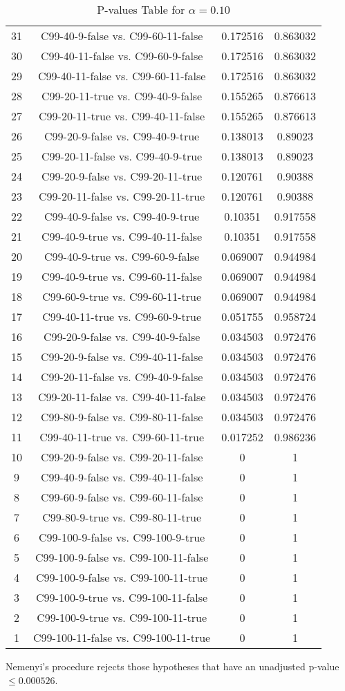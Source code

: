 \documentclass[a4paper,10pt]{article}
\begin{document}
\begin{landscape}
\begin{table}[!htp]
\begin{tabular}{cccc}
31&C99-40-9-false vs. C99-60-11-false&0.172516&0.863032\\
30&C99-40-11-false vs. C99-60-9-false&0.172516&0.863032\\
29&C99-40-11-false vs. C99-60-11-false&0.172516&0.863032\\
28&C99-20-11-true vs. C99-40-9-false&0.155265&0.876613\\
27&C99-20-11-true vs. C99-40-11-false&0.155265&0.876613\\
26&C99-20-9-false vs. C99-40-9-true&0.138013&0.89023\\
25&C99-20-11-false vs. C99-40-9-true&0.138013&0.89023\\
24&C99-20-9-false vs. C99-20-11-true&0.120761&0.90388\\
23&C99-20-11-false vs. C99-20-11-true&0.120761&0.90388\\
22&C99-40-9-false vs. C99-40-9-true&0.10351&0.917558\\
21&C99-40-9-true vs. C99-40-11-false&0.10351&0.917558\\
20&C99-40-9-true vs. C99-60-9-false&0.069007&0.944984\\
19&C99-40-9-true vs. C99-60-11-false&0.069007&0.944984\\
18&C99-60-9-true vs. C99-60-11-true&0.069007&0.944984\\
17&C99-40-11-true vs. C99-60-9-true&0.051755&0.958724\\
16&C99-20-9-false vs. C99-40-9-false&0.034503&0.972476\\
15&C99-20-9-false vs. C99-40-11-false&0.034503&0.972476\\
14&C99-20-11-false vs. C99-40-9-false&0.034503&0.972476\\
13&C99-20-11-false vs. C99-40-11-false&0.034503&0.972476\\
12&C99-80-9-false vs. C99-80-11-false&0.034503&0.972476\\
11&C99-40-11-true vs. C99-60-11-true&0.017252&0.986236\\
10&C99-20-9-false vs. C99-20-11-false&0&1\\
9&C99-40-9-false vs. C99-40-11-false&0&1\\
8&C99-60-9-false vs. C99-60-11-false&0&1\\
7&C99-80-9-true vs. C99-80-11-true&0&1\\
6&C99-100-9-false vs. C99-100-9-true&0&1\\
5&C99-100-9-false vs. C99-100-11-false&0&1\\
4&C99-100-9-false vs. C99-100-11-true&0&1\\
3&C99-100-9-true vs. C99-100-11-false&0&1\\
2&C99-100-9-true vs. C99-100-11-true&0&1\\
1&C99-100-11-false vs. C99-100-11-true&0&1\\
\hline
\end{tabular}
\caption{P-values Table for $\alpha=0.10$}
\end{table}Nemenyi's procedure rejects those hypotheses that have an unadjusted p-value $\le0.000526$.


\end{landscape}
\end{document}
